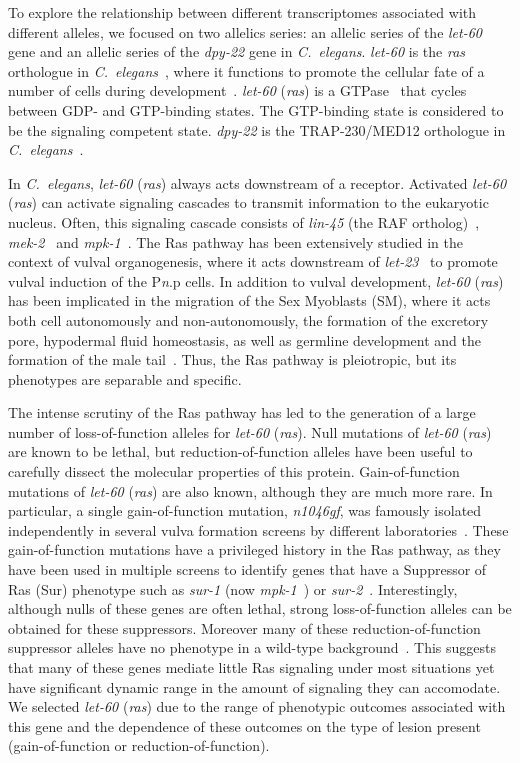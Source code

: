 \documentclass[10pt, onecolumn]{article}
\newcommand{\cel}{\emph{C.~elegans}}
\newcommand{\gene}[1]{\mbox{\emph{#1}}}
\newcommand{\ras}{\gene{let-60} (\emph{ras})}
\begin{document}
To explore the relationship between different transcriptomes associated with
different alleles, we focused on two allelics series: an allelic series of the
\gene{let-60} gene and an allelic series of the \gene{dpy-22} gene in \cel{}.
\gene{let-60} is the \gene{ras} orthologue in \cel{}~\cite{Han1990a}, where it
functions to promote the cellular fate of a number of cells during
development~\cite{Yochem1997}. \ras{} is a GTPase~\cite{Han1990a} that cycles
between GDP- and GTP-binding states. The GTP-binding state is considered to be
the signaling competent state. \gene{dpy-22} is the TRAP-230/MED12 orthologue in
\cel{}~\cite{Zhang2000,Bourbon2004}.

In \cel{}, \ras{} always acts downstream of a receptor. Activated
\ras{} can activate signaling cascades to transmit information to the eukaryotic
nucleus. Often, this signaling cascade consists of \gene{lin-45} (the RAF
ortholog)~\cite{Han1993a}, \gene{mek-2}~\cite{Wu1995} and
\gene{mpk-1}~\cite{Lackner1994}. The Ras pathway has been extensively studied in
the context of vulval organogenesis, where it acts downstream of
\gene{let-23}~\cite{Sternberg1995} to promote vulval induction of the
P\emph{n}.p cells. In addition to vulval development, \ras{} has been implicated
in the migration of the Sex Myoblasts (SM), where it acts both cell autonomously
and non-autonomously, the formation of the excretory pore, hypodermal fluid
homeostasis, as well as germline development and the formation of the male
tail~\cite{Sundaram2006}. Thus, the Ras pathway is pleiotropic, but its
phenotypes are separable and specific.

The intense scrutiny of the Ras pathway has led to the generation of a large
number of loss-of-function alleles for \ras{}. Null mutations of \ras{} are
known to be lethal, but reduction-of-function alleles have been useful to
carefully dissect the molecular properties of this protein. Gain-of-function
mutations of \ras{} are also known, although they are much more rare. In
particular, a single gain-of-function mutation, \emph{n1046gf}, was famously
isolated independently in several vulva formation screens by different
laboratories~\cite{Han1990,Beitel1990a,Ferguson1985}.  These gain-of-function mutations have a privileged history
in the Ras pathway, as they have been used in multiple screens to identify genes
that have a Suppressor of Ras (Sur) phenotype  such as \gene{sur-1} (now \gene{mpk-1}~\cite{Lackner1994}) or
\gene{sur-2}~\cite{Singh1995}. Interestingly, although nulls of these genes are
often lethal, strong loss-of-function alleles can be obtained for these
suppressors. Moreover many of these reduction-of-function suppressor alleles
have no phenotype in a wild-type background~\cite{}. This suggests that many of
these genes mediate little Ras signaling under most situations yet have
significant dynamic range in the amount of signaling they can accomodate. We
selected \ras{} due to the range of phenotypic outcomes associated with this
gene and the dependence of these outcomes on the type of lesion present
(gain-of-function or reduction-of-function).
\end{document}
